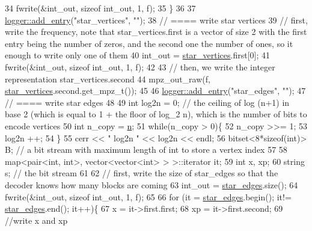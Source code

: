 \begin{DoxyCode}
34     fwrite(&int\_out, \textcolor{keyword}{sizeof} int\_out, 1, f);
35   \}
36 
37   \hyperlink{classlogger_a710163deb17bc81f70d53d285b8ac9ac}{logger::add\_entry}(\textcolor{stringliteral}{"star\_vertices"}, \textcolor{stringliteral}{""});
38   \textcolor{comment}{// ==== write star vertices}
39   \textcolor{comment}{// first, write the frequency, note that star\_vertices.first is a vector of size 2 with the first entry
       being the number of zeros, and the second one the number of ones, so it enough to write only one of them}
40   int\_out = \hyperlink{classmarked__graph__compressed_a7a4ced4586e2e353f9076bd447df5208}{star\_vertices}.first[0];
41   fwrite(&int\_out, \textcolor{keyword}{sizeof} int\_out, 1, f);
42 
43   \textcolor{comment}{// then, we write the integer representation star\_vertices.second}
44   mpz\_out\_raw(f, \hyperlink{classmarked__graph__compressed_a7a4ced4586e2e353f9076bd447df5208}{star\_vertices}.second.get\_mpz\_t());
45 
46   \hyperlink{classlogger_a710163deb17bc81f70d53d285b8ac9ac}{logger::add\_entry}(\textcolor{stringliteral}{"star\_edges"}, \textcolor{stringliteral}{""});
47   \textcolor{comment}{// ==== write star edges}
48 
49   \textcolor{keywordtype}{int} log2n = 0; \textcolor{comment}{// the ceiling of log (n+1) in base 2 (which is equal to 1 + the floor of log\_2 n), which
       is the number of bits to encode vertices}
50   \textcolor{keywordtype}{int} n\_copy = \hyperlink{classmarked__graph__compressed_a8d841016ddb11cfd33748c8deb6277ba}{n};
51   \textcolor{keywordflow}{while}(n\_copy > 0)\{
52     n\_copy >>= 1;
53     log2n ++;
54   \}
55   cerr << \textcolor{stringliteral}{" log2n "} << log2n << endl;
56   bitset<8*sizeof(int)> B; \textcolor{comment}{// a bit stream with maximum length of int to store a vertex index}
57 
58   map<pair<int, int>, vector<vector<int> > >::iterator it;
59   \textcolor{keywordtype}{int} x, xp;
60   \textcolor{keywordtype}{string} s; \textcolor{comment}{// the bit stream}
61 
62   \textcolor{comment}{// first, write the size of star\_edges so that the decoder knows how many blocks are coming}
63   int\_out = \hyperlink{classmarked__graph__compressed_a7df5779d313486644132bd816937f532}{star\_edges}.size();
64   fwrite(&int\_out, \textcolor{keyword}{sizeof} int\_out, 1, f);
65 
66   \textcolor{keywordflow}{for} (it = \hyperlink{classmarked__graph__compressed_a7df5779d313486644132bd816937f532}{star\_edges}.begin(); it!= \hyperlink{classmarked__graph__compressed_a7df5779d313486644132bd816937f532}{star\_edges}.end(); it++)\{
67     x = it->first.first;
68     xp = it->first.second;
69     \textcolor{comment}{//write x and xp}

\end{DoxyCode}
